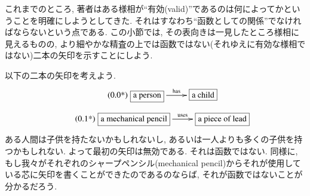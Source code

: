  
これまでのところ, 著者はある様相が``有効(valid)''であるのは何によってかということを明確にしようとしてきた. それはすなわち``函数としての関係''でなければならないという点である. この小節では, その表向きは一見したところ様相に見えるものの, より細やかな精査の上では函数ではない(それゆえに有効な様相ではない)二本の矢印を示すことにしよう.
 

以下の二本の矢印を考えよう.
\begin{align}\tag{\arabic{subsection}.\arabic{equation}*}\addtocounter{equation}{1}\label{dia:invalid 1}
\xymatrixnocompile{\fbox{a person}\LA{r}{has}&\fbox{a child}}
\end{align}
\vspace{-.13in}
\begin{align}\tag{\arabic{subsection}.\arabic{equation}*}\addtocounter{equation}{1}\label{dia:invalid 2}
\xymatrixnocompile{\fbox{a mechanical pencil}\LA{r}{uses}&\fbox{a piece of lead}}
\end{align}  
ある人間は子供を持たないかもしれないし, あるいは一人よりも多くの子供を持つかもしれない. よって最初の矢印は無効である. それは函数ではない. 同様に, もし我々がそれぞれのシャープペンシル(mechanical pencil)からそれが使用している芯に矢印を書くことができたのであるのならば, それが函数ではないことが分かるだろう.

